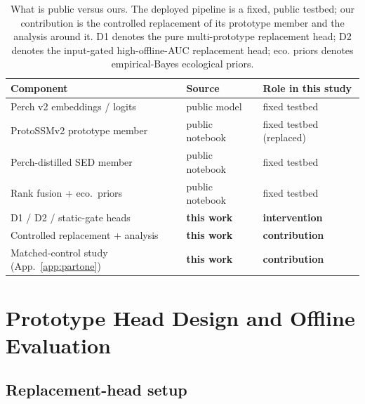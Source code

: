 \documentclass{ceurart}
\begin{document}
\begin{table}[t]
\caption{What is public versus ours. The deployed pipeline is a fixed, public testbed; our contribution is the controlled replacement of its prototype member and the analysis around it. D1 denotes the pure multi-prototype replacement head; D2 denotes the input-gated high-offline-AUC replacement head; eco. priors denotes empirical-Bayes ecological priors.}
\label{tab:ownership}
\begin{tabular}{lll}
\toprule
Component & Source & Role in this study \\
\midrule
Perch v2 embeddings / logits & public model~\cite{ghani2023global} & fixed testbed \\
ProtoSSMv2 prototype member & public notebook~\cite{protossmv2} & fixed testbed (replaced) \\
Perch-distilled SED member & public notebook~\cite{protossmv2} & fixed testbed \\
Rank fusion + eco.\ priors & public notebook~\cite{protossmv2} & fixed testbed \\
D1 / D2 / static-gate heads & \textbf{this work} & \textbf{intervention} \\
Controlled replacement + analysis & \textbf{this work} & \textbf{contribution} \\
Matched-control study (App.~\ref{app:partone}) & \textbf{this work} & \textbf{contribution} \\
\bottomrule
\end{tabular}
\end{table}


\section{Prototype Head Design and Offline Evaluation}
\label{sec:part2}

\subsection{Replacement-head setup}
\label{sec:headsetup}
\end{document}
